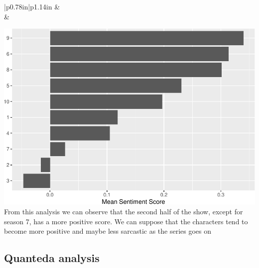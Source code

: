 \documentclass[
]{article}
\begin{document}
\begin{longtable}[c]{|p{0.78in}|p{1.14in}}
 &  \\





 &  \\




\end{longtable}

\includegraphics{report_files/figure-latex/unnamed-chunk-39-1.pdf} From
this analysis we can observe that the second half of the show, except
for season 7, has a more positive score. We can suppose that the
characters tend to become more positive and maybe less sarcastic as the
series goes on

\hypertarget{quanteda-analysis}{%
\subsection{Quanteda analysis}\label{quanteda-analysis}}
\end{document}
